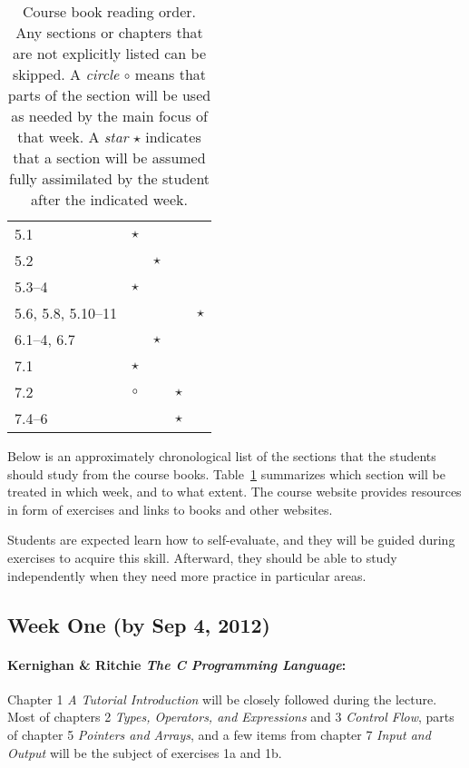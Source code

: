 \documentclass[a4paper]{article}
\begin{document}
\begin{table}
\begin{tabular}{|l|c|c|c|c|}
    5.1                & $\star$ &         &         & \\
    5.2                &         & $\star$ &         & \\
    5.3--4             & $\star$ &         &         & \\
    5.6, 5.8, 5.10--11 &         &         &         & $\star$ \\
    \hline
    6.1--4, 6.7        &         & $\star$ &         & \\
    \hline
    7.1                & $\star$ &         &         & \\
    7.2                & $\circ$ &         & $\star$ & \\
    7.4--6             &         &         & $\star$ & \\
    \hline
  \end{tabular}
  \caption{
    Course book reading order.
    Any sections or chapters that are not explicitly listed can be skipped.
    A \emph{circle} $\circ$ means that parts of the section will be used as needed by the main focus of that week.
    A \emph{star} $\star$ indicates that a section will be assumed fully assimilated by the student after the indicated week.
  }\label{tab:reading-guide}
\end{table}

Below is an approximately chronological list of the sections that the students should study from the course books.
Table~\ref{tab:reading-guide} summarizes which section will be treated in which week, and to what extent.
The course website provides resources in form of exercises and links to books and other websites.

Students are expected learn how to self-evaluate, and they will be guided during exercises to acquire this skill.
Afterward, they should be able to study independently when they need more practice in particular areas.


\subsection*{Week One (by Sep 4, 2012)}

\paragraph{Kernighan \& Ritchie \emph{The C Programming Language}:}
Chapter 1 \emph{A Tutorial Introduction} will be closely followed during the lecture.
Most of chapters 2 \emph{Types, Operators, and Expressions} and 3 \emph{Control Flow}, parts of chapter 5 \emph{Pointers and Arrays}, and a few items from chapter 7 \emph{Input and Output} will be the subject of exercises 1a and 1b.
\end{document}
